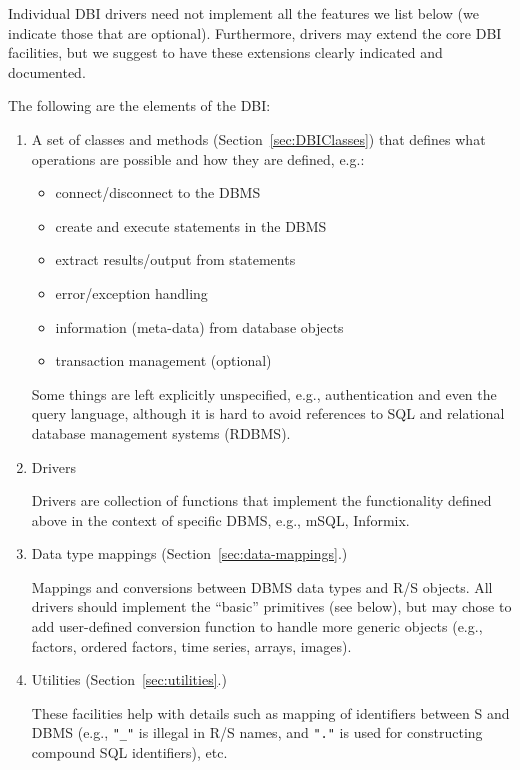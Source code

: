 \documentclass{article}
\begin{document}
Individual DBI drivers need not implement all the features we
list below (we indicate those that are optional).  Furthermore,
drivers may extend the core DBI facilities, but we suggest to have
these extensions clearly indicated and documented.

The following are the elements of the DBI:
\begin{enumerate}
\item A set of classes and methods (Section~\ref{sec:DBIClasses})
  that defines what operations are possible and how they are defined, 
  e.g.:
  \begin{itemize}
  \item connect/disconnect to the DBMS
  \item create and execute statements in the DBMS
  \item extract results/output from statements
  \item error/exception handling
  \item information (meta-data) from database objects
  \item transaction management (optional)
  \end{itemize}

  Some things are left explicitly unspecified, e.g., authentication
  and even the query language, although it is hard to avoid references 
  to SQL and relational database management systems (RDBMS).

\item Drivers
  
  Drivers are collection of functions that implement the functionality
  defined above in the context of specific DBMS, e.g., mSQL, Informix.

\item Data type mappings (Section~\ref{sec:data-mappings}.)
  
  Mappings and conversions between DBMS data types and R/S objects.
  All drivers should implement the ``basic'' primitives (see below), 
  but may chose to add user-defined conversion function to handle
  more generic objects (e.g., factors, ordered factors, time series,
  arrays, images).

\item Utilities (Section~\ref{sec:utilities}.)
  
  These facilities help with details such as mapping of identifiers
  between S and DBMS (e.g., \texttt{"\_"} is illegal in R/S
  names, and \texttt{"."} is used for constructing compound SQL
  identifiers), etc.

\end{enumerate}
\end{document}
